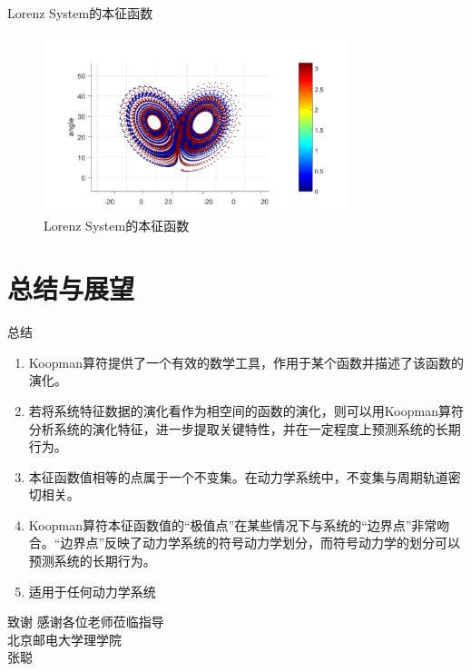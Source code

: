 \documentclass{beamer}
\begin{document}
\begin{frame}{Lorenz System的本征函数}
	\begin{figure}
		\centering
		\includegraphics[width=3.5in]{figure/lorenz_eigen_bin}
		\caption{Lorenz System的本征函数}
	\end{figure}
\end{frame}

\section{总结与展望}
\begin{frame}{总结}
	\begin{enumerate}
		\item Koopman算符提供了一个有效的数学工具，作用于某个函数并描述了该函数的演化。
		\item 若将系统特征数据的演化看作为相空间的函数的演化，则可以用Koopman算符分析系统的演化特征，进一步提取关键特性，并在一定程度上预测系统的长期行为。
		\item 本征函数值相等的点属于一个不变集。在动力学系统中，不变集与周期轨道密切相关。
		\item Koopman算符本征函数值的“极值点”在某些情况下与系统的“边界点”非常吻合。“边界点”反映了动力学系统的符号动力学划分，而符号动力学的划分可以预测系统的长期行为。
		\item 适用于任何动力学系统
	\end{enumerate}
\end{frame}

\begin{frame}{致谢}
\centering
\huge 感谢各位老师莅临指导\\[30pt]
\normalsize 北京邮电大学理学院\\
张聪
\end{frame}
\end{document}
